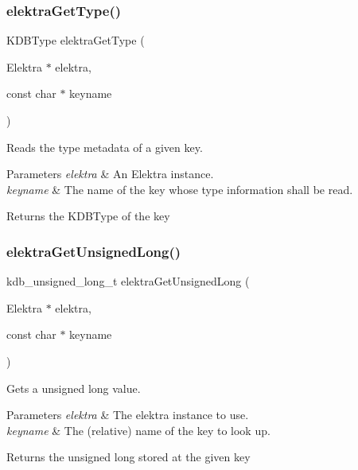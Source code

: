 \subsubsection{\texorpdfstring{elektra\+Get\+Type()}{elektraGetType()}}
{\footnotesize\ttfamily K\+D\+B\+Type elektra\+Get\+Type (\begin{DoxyParamCaption}\item[{Elektra $\ast$}]{elektra,  }\item[{const char $\ast$}]{keyname }\end{DoxyParamCaption})}



Reads the type metadata of a given key. 


\begin{DoxyParams}{Parameters}
{\em elektra} & An Elektra instance. \\
\hline
{\em keyname} & The name of the key whose type information shall be read. \\
\hline
\end{DoxyParams}
\begin{DoxyReturn}{Returns}
the K\+D\+B\+Type of the key 
\end{DoxyReturn}
\mbox{\label{group__highlevel_gabd5a96b1c280fcf74509b1262ee339b6}} 
\subsubsection{\texorpdfstring{elektra\+Get\+Unsigned\+Long()}{elektraGetUnsignedLong()}}
{\footnotesize\ttfamily kdb\+\_\+unsigned\+\_\+long\+\_\+t elektra\+Get\+Unsigned\+Long (\begin{DoxyParamCaption}\item[{Elektra $\ast$}]{elektra,  }\item[{const char $\ast$}]{keyname }\end{DoxyParamCaption})}



Gets a unsigned long value. 


\begin{DoxyParams}{Parameters}
{\em elektra} & The elektra instance to use. \\
\hline
{\em keyname} & The (relative) name of the key to look up. \\
\hline
\end{DoxyParams}
\begin{DoxyReturn}{Returns}
the unsigned long stored at the given key 
\end{DoxyReturn}
\mbox{\label{group__highlevel_ga8eb3597a96134c11f5d04a4613c44b92}} 
